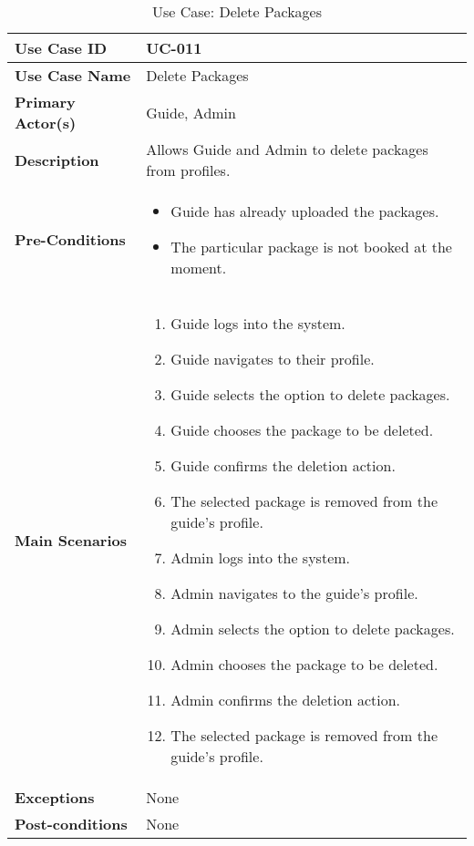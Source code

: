 \begin{table}[ht]
    \centering
    \begin{tabular}{|l|p{}|}
        \hline
        \textbf{Use Case ID} & UC-011 \\
        \hline
        \textbf{Use Case Name} & Delete Packages \\
        \hline
        \textbf{Primary Actor(s)} & Guide, Admin \\
        \hline
        \textbf{Description} & Allows Guide and Admin to delete packages from profiles. \\
        \hline
        \textbf{Pre-Conditions} & 
        \begin{itemize}[itemsep=0pt]
            \item Guide has already uploaded the packages.
            \item The particular package is not booked at the moment.
        \end{itemize} \\
        \hline
        \textbf{Main Scenarios} & 
        \begin{enumerate}[label=\arabic*.,itemsep=0pt]
            \item Guide logs into the system.
            \item Guide navigates to their profile.
            \item Guide selects the option to delete packages.
            \item Guide chooses the package to be deleted.
            \item Guide confirms the deletion action.
            \item The selected package is removed from the guide's profile.
            \item Admin logs into the system.
            \item Admin navigates to the guide's profile.
            \item Admin selects the option to delete packages.
            \item Admin chooses the package to be deleted.
            \item Admin confirms the deletion action.
            \item The selected package is removed from the guide's profile.
        \end{enumerate} \\
        \hline
        \textbf{Exceptions} & None \\
        \hline
        \textbf{Post-conditions} & None \\
        \hline
    \end{tabular}
    \label{tab:use-case-delete-packages}
    \caption{Use Case: Delete Packages}
\end{table}


